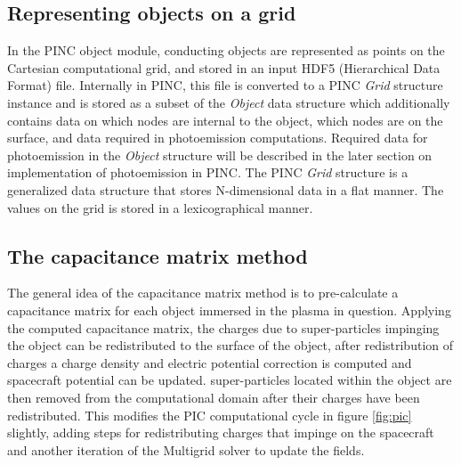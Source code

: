 \subsection{Representing objects on a grid}
In the PINC object module, conducting objects are represented as points on the Cartesian computational grid, and stored in an input HDF5 (Hierarchical Data Format) file. Internally in PINC, this file is converted to a PINC \textit{Grid} structure instance and is stored as a subset of the \textit{Object} data structure which additionally contains data on which nodes are internal to the object, which nodes are on the surface, and data required in photoemission computations. Required data for photoemission in the \textit{Object} structure will be described in the later section on implementation of photoemission in PINC. The PINC \textit{Grid} structure is a generalized data structure that stores N-dimensional data in a flat manner. The values on the grid is stored in a lexicographical manner.

\subsection{The capacitance matrix method}
The general idea of the capacitance matrix method is to pre-calculate a capacitance matrix for each object immersed in the plasma in question. Applying the computed capacitance matrix, the charges due to super-particles impinging the object can be redistributed to the surface of the object, after redistribution of charges a charge density and electric potential correction is computed and spacecraft potential can be updated. super-particles located within the object are then removed from the computational domain after their charges have been redistributed. This modifies the PIC computational cycle in figure \cref{fig:pic} slightly, adding steps for redistributing charges that impinge on the spacecraft and another iteration of the Multigrid solver to update the fields.

